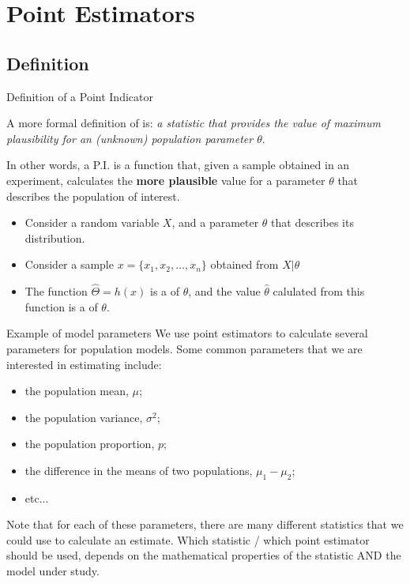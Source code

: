 \section{Point Estimators}

\subsection{Definition}

\begin{frame}{Definition of a Point Indicator}

A more formal definition of  is: \emph{a statistic
that provides the value of maximum plausibility for an (unknown) population
parameter $\theta$}.\bigskip

In other words, a P.I. is a function that, given a sample obtained in an
experiment, calculates the {\bf more plausible} value for a parameter $\theta$
that describes the population of interest.\bigskip

\begin{itemize}
  \item Consider a random variable $X$, and a parameter $\theta$ that describes its distribution.
  \item Consider a sample $x = \{x_1, x_2, \ldots, x_n\}$ obtained from $X|\theta$
  \item The function $\hat{\Theta} = h\left(x\right)$ is a  of $\theta$, and the value $\hat\theta$ calulated from this function is a  of $\theta$.
\end{itemize}
\end{frame}

\begin{frame}{Example of model parameters}
We use point estimators to calculate several parameters for
population models. Some common parameters that we are interested
in estimating include:\bigskip

\begin{itemize}
  \item the population mean, $\mu$;
	\item the population variance, $\sigma^2$;
	\item the population proportion, $p$;
	\item the difference in the means of two populations, $\mu_1-\mu_2$;
	\item etc...
\end{itemize}\bigskip

Note that for each of these parameters, there are many different statistics that we could use to calculate an estimate. Which statistic / which point estimator should be used, depends on the mathematical properties of the statistic AND the model under study.
\end{frame}

